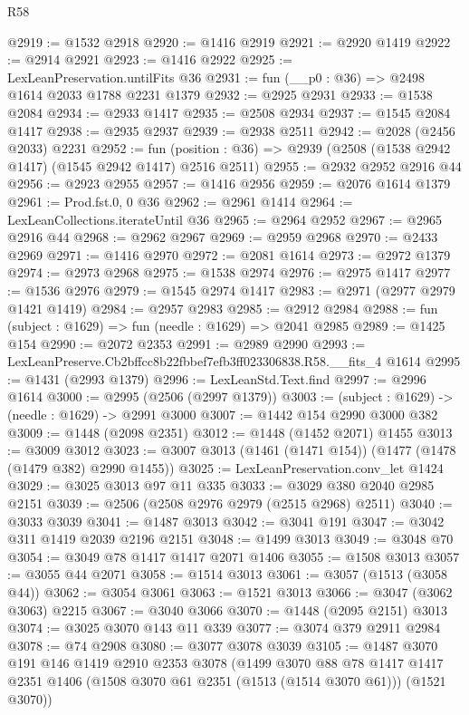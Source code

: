 \begin{lexlean}{R58}
\begin{coremodule}
{{@2919 := @1532 @2918
@2920 := @1416 @2919
@2921 := @2920 @1419
@2922 := @2914 @2921
@2923 := @1416 @2922
@2925 := LexLeanPreservation.untilFits @36
@2931 := fun (__p0 : @36) => @2498 @1614 @2033 @1788 @2231 @1379
@2932 := @2925 @2931
@2933 := @1538 @2084
@2934 := @2933 @1417
@2935 := @2508 @2934
@2937 := @1545 @2084 @1417
@2938 := @2935 @2937
@2939 := @2938 @2511
@2942 := @2028 (@2456 @2033) @2231
@2952 := fun (position : @36) => @2939 (@2508 (@1538 @2942 @1417) (@1545 @2942 @1417) @2516 @2511)
@2955 := @2932 @2952 @2916 @44
@2956 := @2923 @2955
@2957 := @1416 @2956
@2959 := @2076 @1614 @1379
@2961 := Prod.fst.{0, 0} @36
@2962 := @2961 @1414
@2964 := LexLeanCollections.iterateUntil @36
@2965 := @2964 @2952
@2967 := @2965 @2916 @44
@2968 := @2962 @2967
@2969 := @2959 @2968
@2970 := @2433 @2969
@2971 := @1416 @2970
@2972 := @2081 @1614
@2973 := @2972 @1379
@2974 := @2973 @2968
@2975 := @1538 @2974
@2976 := @2975 @1417
@2977 := @1536 @2976
@2979 := @1545 @2974 @1417
@2983 := @2971 (@2977 @2979 @1421 @1419)
@2984 := @2957 @2983
@2985 := @2912 @2984
@2988 := fun (subject : @1629) => fun (needle : @1629) => @2041 @2985
@2989 := @1425 @154
@2990 := @2072 @2353
@2991 := @2989 @2990
@2993 := LexLeanPreserve.Cb2bffcc8b22fbbef7efb3ff023306838.R58.__fits_4 @1614
@2995 := @1431 (@2993 @1379)
@2996 := LexLeanStd.Text.find
@2997 := @2996 @1614
@3000 := @2995 (@2506 (@2997 @1379))
@3003 := (subject : @1629) -> (needle : @1629) -> @2991 @3000
@3007 := @1442 @154 @2990 @3000 @382
@3009 := @1448 (@2098 @2351)
@3012 := @1448 (@1452 @2071) @1455
@3013 := @3009 @3012
@3023 := @3007 @3013 (@1461 (@1471 @154)) (@1477 (@1478 (@1479 @382) @2990 @1455))
@3025 := LexLeanPreservation.conv_let @1424
@3029 := @3025 @3013 @97 @11 @335
@3033 := @3029 @380 @2040 @2985 @2151
@3039 := @2506 (@2508 @2976 @2979 (@2515 @2968) @2511)
@3040 := @3033 @3039
@3041 := @1487 @3013
@3042 := @3041 @191
@3047 := @3042 @311 @1419 @2039 @2196 @2151
@3048 := @1499 @3013
@3049 := @3048 @70
@3054 := @3049 @78 @1417 @1417 @2071 @1406
@3055 := @1508 @3013
@3057 := @3055 @44 @2071
@3058 := @1514 @3013
@3061 := @3057 (@1513 (@3058 @44))
@3062 := @3054 @3061
@3063 := @1521 @3013
@3066 := @3047 (@3062 @3063) @2215
@3067 := @3040 @3066
@3070 := @1448 (@2095 @2151) @3013
@3074 := @3025 @3070 @143 @11 @339
@3077 := @3074 @379 @2911 @2984
@3078 := @74 @2908
@3080 := @3077 @3078 @3039
@3105 := @1487
    @3070
    @191
    @146
    @1419
    @2910
    @2353
    @3078
    (@1499
      @3070
      @88
      @78
      @1417
      @1417
      @2351
      @1406
      (@1508 @3070 @61 @2351 (@1513 (@1514 @3070 @61)))
      (@1521 @3070))
}}
\end{coremodule}
\end{lexlean}
